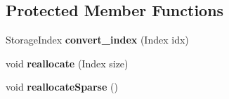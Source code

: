 \subsection*{Protected Member Functions}
\begin{DoxyCompactItemize}
\item 
\mbox{\label{class_eigen_1_1internal_1_1_ambi_vector_a67176aa3101e7ec02ea335bda34d96ea}} 
Storage\+Index {\bfseries convert\+\_\+index} (Index idx)
\item 
\mbox{\label{class_eigen_1_1internal_1_1_ambi_vector_af1131fb62ecadc60ced9720d23981c80}} 
void {\bfseries reallocate} (Index size)
\item 
\mbox{\label{class_eigen_1_1internal_1_1_ambi_vector_a521d148b17759b10a6ff9c66cf9308e4}} 
void {\bfseries reallocate\+Sparse} ()
\end{DoxyCompactItemize}
